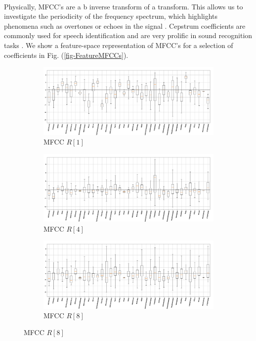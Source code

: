 \documentclass[12pt,letterpaper]{article}
\begin{document}
\paragraph*{}Physically, MFCC's are a b inverse transform of a transform. This allows us to investigate the periodicity of the frequency spectrum, which highlights phenomena such as overtones or echoes in the signal \cite{Virtanen}. Cepstrum coefficients are commonly used for speech identification and are very prolific in sound recognition tasks \cite{Serizel,Sahidullah,Liu}. We show a feature-space representation of MFCC's for a selection of coefficients in Fig. (\ref{fig-FeatureMFCCs}).

\begin{figure}[H]
\begin{center}

\begin{subfigure}{1.0\textwidth}
	\centering
	\includegraphics[width=\textwidth , height=0.2\textheight]
		{../FiguresFeatures/MFCC_1}
	\caption{MFCC $R[1]$}
	\end{subfigure}
	
	\begin{subfigure}{1.0\textwidth}
	\centering
	\includegraphics[width=\textwidth , height=0.2\textheight]
		{../FiguresFeatures/MFCC_4}
	\caption{MFCC $R[4]$}
	\end{subfigure}
	
	\begin{subfigure}{1.0\textwidth}
	\centering
	\includegraphics[width=\textwidth , height=0.2\textheight]
		{../FiguresFeatures/MFCC_8}
	\caption{MFCC $R[8]$}
	\end{subfigure}
	

\end{center}
\end{figure}
\end{document}
